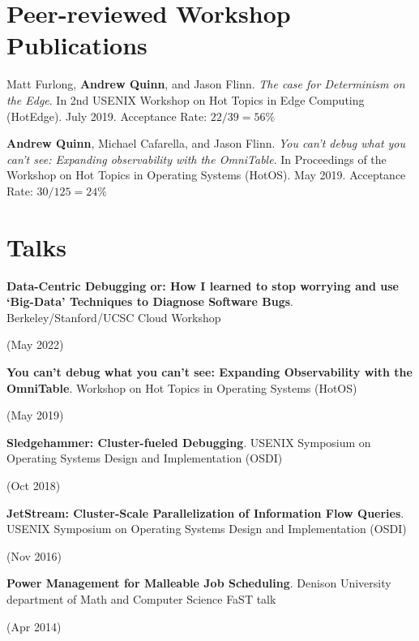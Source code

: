 \documentclass[letterpaper,10pt]{article}
\newcommand{\sidebyside}[2]{
  \begin{minipage}[t]{.75\textwidth}
    \raggedright{}
    #2
  \end{minipage}
  \hspace{.01\textwidth}
    \begin{minipage}[t]{.205\textwidth}
    \raggedleft
    #1
  \end{minipage}
}
\newcommand{\paper}[3]{#1. #2 #3}
\newcommand{\trio}[3]{\sidebyside{#3}{\textbf{#1}. #2}}
\begin{document}
\section{Peer-reviewed Workshop Publications}
\begin{smenumerate}
  \item \paper{Matt Furlong, \textbf{Andrew Quinn}, and Jason Flinn}
    {\emph{The case for Determinism on the Edge}.  In 2nd USENIX
      Workshop on Hot Topics in Edge Computing (HotEdge).  July
      2019.}{Acceptance Rate: $22/39=56\%$}
  \item \paper{\textbf{Andrew Quinn}, Michael Cafarella, and Jason
    Flinn}{\emph{You can't debug what you can't see: Expanding
    observability with the OmniTable}. In Proceedings of the Workshop
    on Hot Topics in Operating Systems (HotOS).  May 2019.}{Acceptance
    Rate: $30/125=24\%$}
\end{smenumerate}


\section{Talks}
\begin{smenumerate}
\item\trio{Data-Centric Debugging or: How I learned to stop worrying
  and use `Big-Data' Techniques to Diagnose Software
  Bugs}{Berkeley/Stanford/UCSC Cloud Workshop}{(May 2022)}
\item\trio{You can't debug what you can't see: Expanding Observability
  with the OmniTable}{Workshop on Hot Topics in Operating Systems
  (HotOS)}{(May 2019)}
\item\trio{Sledgehammer: Cluster-fueled Debugging}{USENIX Symposium on
  Operating Systems Design and Implementation (OSDI)}{(Oct 2018)}
\item\trio{JetStream: Cluster-Scale Parallelization of Information
  Flow Queries}{USENIX Symposium on Operating Systems Design and
  Implementation (OSDI)}{(Nov 2016)}
\item\trio{Power Management for Malleable Job Scheduling}{Denison
  University department of Math and Computer Science FaST talk}{(Apr
  2014)}
\end{smenumerate}


\end{document}
